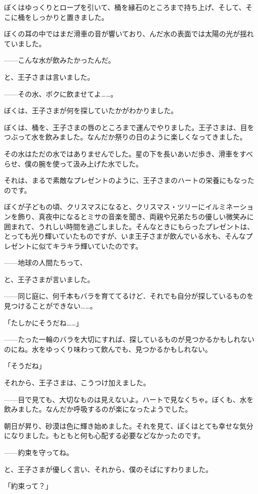 ぼくはゆっくりとロープを引いて、桶を縁石のところまで持ち上げ、そして、そこに桶をしっかりと置きました。

ぼくの耳の中ではまだ滑車の音が響いており、んだ水の表面では太陽の光が揺れていました。

——こんな水が飲みたかったんだ。

と、王子さまは言いました。

——その水、ボクに飲ませてよ……。

ぼくは、王子さまが何を探していたかがわかりました。

ぼくは、桶を、王子さまの唇のところまで運んでやりました。王子さまは、目をつぶって水を飲みました。なんだか祭りの日のように楽しくなってきました。

その水はただの水ではありませんでした。星の下を長いあいだ歩き、滑車をすべらせ、僕の腕を使って汲み上げた水でした。

それは、まるで素敵なプレゼントのように、王子さまのハートの栄養にもなったのです。

ぼくが子どもの頃、クリスマスになると、クリスマス・ツリーにイルミネーションを飾り、真夜中になるとミサの音楽を聞き、両親や兄弟たちの優しい微笑みに囲まれて、うれしい時間を過ごしました。そんなときにもらったプレゼントは、とっても光り輝いていたものですが、いま王子さまが飲んでいる水も、そんなプレゼントに似てキラキラ輝いていたのです。

——地球の人間たちって、

と、王子さまが言いました。

——同じ庭に、何千本もバラを育ててるけど．それでも自分が探しているものを見つけることができない……。

「たしかにそうだね……」

——たった一輪のバラを大切にすれば、探しているものが見つかるかもしれないのにね。水をゆっくり味わって飲んでも、見つかるかもしれない。

「そうだね」

それから、王子さまは、こうつけ加えました。

——目で見ても、大切なものは見えないよ。ハートで見なくちゃ。ぼくも、水を飲みました。なんだか呼吸するのが楽になったようでした。

朝日が昇り、砂漠は色に輝き始めました。それを見て、ぼくはとても幸せな気分になりました。もともと何も心配する必要などなかったのです。

——約束を守ってね。

と、王子さまが優しく言い、それから、僕のそばにすわりました。

「約束って？」

